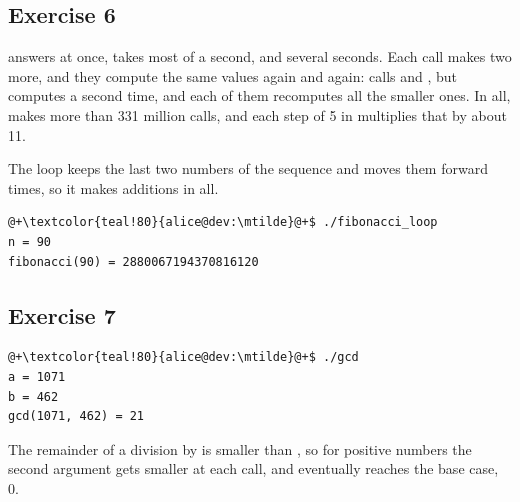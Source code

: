 \subsection*{Exercise 6}



 answers at once,  takes most of a
second, and  several seconds. Each call makes two more, and
they compute the same values again and again:  calls
 and , but 
computes  a second time, and each of them recomputes all the
smaller ones. In all,  makes more than 331 million calls,
and each step of 5 in  multiplies that by about 11.

The loop keeps the last two numbers of the sequence and moves them forward
 times, so it makes  additions in all.


\vspace{-10pt}%
\begin{lstlisting}[style=bashVerb, escapechar=@+]
@+\textcolor{teal!80}{alice@dev:\mtilde}@+$ ./fibonacci_loop
n = 90
fibonacci(90) = 2880067194370816120
\end{lstlisting}

\subsection*{Exercise 7}


\vspace{-10pt}%
\begin{lstlisting}[style=bashVerb, escapechar=@+]
@+\textcolor{teal!80}{alice@dev:\mtilde}@+$ ./gcd
a = 1071
b = 462
gcd(1071, 462) = 21
\end{lstlisting}

The remainder of a division by  is smaller than , so for
positive numbers the second argument gets smaller at each call, and eventually
reaches the base case, 0.

